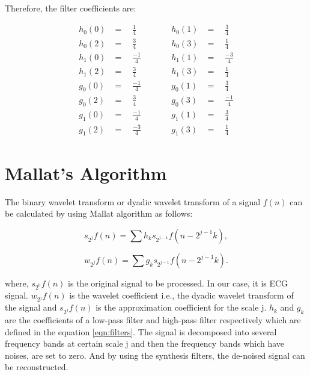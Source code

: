 Therefore, the filter coefficients are:

\begin{equation}
\label{eqn:filters}
\begin{aligned}
h_0(0) & =  \quad \frac{1}{4}    & \quad &\quad  h_0(1) &= \quad \frac{3}{4} \\
h_0(2) & =  \quad \frac{3}{4}    & \quad &\quad   h_0(3) &= \quad \frac{1}{4} \\[1ex]
h_1(0) & =  \quad \frac{- 1}{4}  & \quad &\quad   h_1(1) &= \quad \frac{-3}{4} \\
h_1(2) & =  \quad \frac{3}{4}    & \quad &\quad   h_1(3) &= \quad \frac{1}{4} \\[1ex]
g_0(0) & =  \quad \frac{-1}{4}   & \quad &\quad   g_0(1) &= \quad \frac{3}{4} \\
g_0(2) & =  \quad \frac{3}{4}    & \quad &\quad   g_0(3) &= \quad \frac{-1}{4} \\[1ex]
g_1(0) & =  \quad \frac{-1}{4}   & \quad &\quad   g_1(1) &= \quad \frac{3}{4} \\
g_1(2) & =  \quad \frac{-3}{4}   & \quad &\quad   g_1(3) &= \quad \frac{1}{4}
\end{aligned}
\end{equation}




\section{Mallat's Algorithm}
The binary wavelet transform or dyadic wavelet transform of a signal $f(n)$ can be calculated by using Mallat algorithm \cite{119727} as follows:

\begin{equation} 
{ s_{2^j}f(n) = \sum h_ks_{2^{j-1}}f(n - 2^{j-1}k),   }
\end{equation}

\begin{equation} 
{ w_{2^j}f(n) = \sum g_ks_{2^{j-1}}f(n - 2^{j-1}k).   }
\end{equation}

where, $s_{2^0}f(n)$ is the original signal to be processed. In our case, it is ECG signal. $w_{2^j}f(n)$ is the wavelet coefficient i.e., the dyadic wavelet transform of the signal and $s_{2^j}f(n)$ is the approximation coefficient for the scale j. $h_k$ and $g_k$ are the coefficients of a low-pass filter and high-pass filter respectively which are defined in the equation \ref{eqn:filters}. The signal is decomposed into several frequency bands at certain scale j and then the frequency bands which have noises, are set to zero. And by using the synthesis filters, the de-noised signal can be reconstructed.



